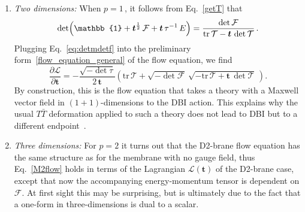 \documentclass[11pt]{article}
\newcommand{\be}{\begin{equation}}
\newcommand{\ee}{\end{equation}}
\newcommand{\CF}{\mathcal{F}}
\newcommand{\CT}{\mathcal{T}}
\newcommand{\tr}{\text{tr}}
\renewcommand{\emph}[1]{\textit{#1}}
\newcommand{\lambdap}{\boldsymbol{t}}
\begin{document}
\begin{enumerate}[(1)]

\item

\emph{Two dimensions:} When $p = 1$\,, it follows from Eq.~\eqref{getT} that
%
\be \label{eq:detmdetf}
    \det \Bigl( \mathbb{1} + \lambdap^{\frac{1}{2}} \, \CF + \lambdap \, \tau^{-1} \, E \Bigr) =  \frac{\det \CF}{\tr \,\CT - \lambdap \, \det \CT}\,. 
\ee
%
Plugging Eq.~\eqref{eq:detmdetf} into the preliminary form~\eqref{flow_equation_general} of the flow equation, we find
%
\be
    \frac{\partial \mathcal{L}}{\partial \lambdap}
    =- \frac{\sqrt{-\det \tau}}{2 \, \lambdap}  \left( 
        \tr \, \CT
        +
        \sqrt{ - \det \mathcal{F}} \, \sqrt{- \tr \, \CT + \lambdap \, \det \CT}
        \,\right).
\ee
%
By construction, this is the flow equation that takes a theory with a Maxwell vector field in $(1+1)$-dimensions to the DBI action. 
This explains why the usual $T\bar T$ deformation applied to such a theory does not lead to DBI but to a different endpoint~\cite{Conti:2018jho,Brennan:2019azg}.

\item \emph{Three dimensions:} For $p=2$ it turns out that the D2-brane flow equation has the same structure as for the membrane with no gauge field, thus Eq.~\eqref{M2flow} holds in terms of the Lagrangian $\mathcal{L} (\lambdap)$ of the D2-brane case, except that now the accompanying energy-momentum tensor is dependent on $\CF$.
At first sight this may be surprising, but is ultimately due to the fact that a one-form in three-dimensions is dual to a scalar. 


\end{enumerate}
\end{document}
